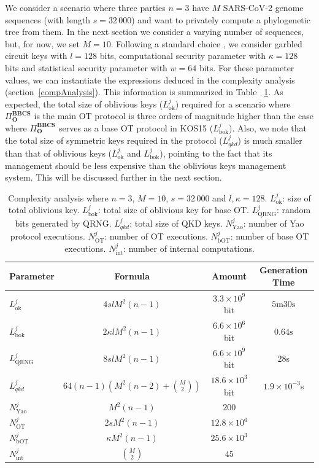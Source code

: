 We consider a scenario where three parties $n=3$ have $M$ SARS-CoV-2 genome sequences (with length $s=32\,000$) and want to privately compute a phylogenetic tree from them. In the next section we consider a varying number of sequences, but, for now, we set $M=10$. Following a standard choice \cite{ALSZ13}, we consider garbled circuit keys with $l = 128$ bits, computational security parameter with $\kappa = 128$ bits and statistical security parameter with $w = 64$ bits. For these parameter values, we can instantiate the expressions deduced in the complexity analysis (section~\ref{compAnalysis}). This information is summarized in Table~ \ref{table:phylo_tree_complexity}. As expected, the total size of oblivious keys ($L^j_{\text{ok}}$) required for a scenario where $\Pi^{\textbf{BBCS}}_{\textbf{O}}$ is the main OT protocol is three orders of magnitude higher than the case where $\Pi^{\textbf{BBCS}}_{\textbf{O}}$ serves as a base OT protocol in KOS15 ($L^j_{\text{bok}}$). Also, we note that the total size of symmetric keys required in the protocol ($L^j_{qkd}$) is much smaller than that of oblivious keys ($L^j_{\text{ok}}$ and $L^j_{\text{bok}}$), pointing to the fact that its management should be less expensive than the oblivious keys management system. This will be discussed further in the next section.

\begin{table}[t]
\centering
\begin{tabular}{lccc}
\toprule
Parameter & Formula & Amount & Generation Time \\ 
\midrule
$L^j_{\text{ok}}$ & $4slM^2(n-1)$ & $3.3 \times 10^9$ bit & $5\text{m}30\text{s}$ \\ 
$L^j_{\text{bok}}$ & $2\kappa lM^2(n-1)$ & $6.6 \times 10^6$ bit & $0.64\text{s}$ \\ 
$L^j_{\text{QRNG}}$ & $8slM^2(n-1)$ & $6.6 \times 10^9$ bit & $28$s \\ 
$L^{j}_{qkd}$ & $64(n-1)(M^2(n-2) + \binom{M}{2})$ & $18.6 \times 10^3$ bit & $1.9\times 10^{-3}$s \\
$N^j_{\text{Yao}}$ & $M^2(n-1)$ & $200$ &  \\ 
$N^j_{\text{OT}}$ & $2sM^2(n-1)$ & $12.8 \times 10^6$ &  \\ 
$N^j_{\text{bOT}}$ & $\kappa M^2(n-1)$ & $25.6 \times 10^3$ &  \\
$N^j_{\text{int}}$ & $\binom{M}{2}$ & $45$ &  \\ 
\bottomrule
\end{tabular}
\caption{Complexity analysis where $n=3$, $M=10$, $s=32\,000$ and $l, \kappa=128$. $L^j_{\text{ok}}$: size of total oblivious key. $L^j_{\text{bok}}$:  total size of oblivious key for base OT. $L^j_{\text{QRNG}}$: random bits generated by QRNG. $L^{j}_{qkd}$: total size of QKD keys. $N^j_{\text{Yao}}$: number of Yao protocol executions. $N^j_{\text{OT}}$: number of OT executions. $N^j_{\text{bOT}}$: number of base OT executions. $N^j_{\text{int}}$: number of internal computations.}
\label{table:phylo_tree_complexity}
\end{table}

